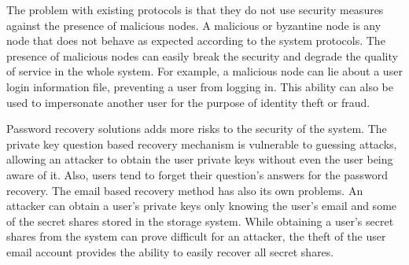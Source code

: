 %



The problem with existing protocols is that they do not use security measures against the presence of malicious nodes.
A malicious or byzantine node is any node that does
not behave as expected according to the system protocols. The presence of
malicious nodes can easily break the security and degrade the quality of
service in the whole system. For example, a malicious node can lie about a user login
information file, preventing a user from logging in. This ability can also be
used to impersonate another user for the purpose of identity theft or fraud.

Password recovery solutions adds more risks to the security of the system.
The private key question based recovery mechanism is vulnerable to guessing
attacks, allowing an attacker to obtain the user private keys without even the user
being aware of it. Also, users tend to forget their question's answers for
the password recovery. The email based recovery method has also its own
problems. An attacker can obtain a user's private keys only knowing the user's
email and some of the secret shares stored in the storage system. While
obtaining a user's secret shares from the system can prove
difficult for an attacker, the theft of the user email
account provides the ability to easily recover all secret shares.

